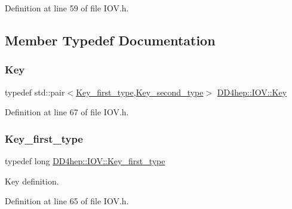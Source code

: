 Definition at line 59 of file I\+O\+V.\+h.



\subsection{Member Typedef Documentation}
\hypertarget{class_d_d4hep_1_1_i_o_v_a07cb46dc875296dc9cccf4ff370104ae}{}\label{class_d_d4hep_1_1_i_o_v_a07cb46dc875296dc9cccf4ff370104ae} 
\subsubsection{\texorpdfstring{Key}{Key}}
{\footnotesize\ttfamily typedef std\+::pair$<$\hyperlink{class_d_d4hep_1_1_i_o_v_a3f518f6b507c82c4ee614e52b3519325}{Key\+\_\+first\+\_\+type},\hyperlink{class_d_d4hep_1_1_i_o_v_ae1e4d1584dcc17a416008a93d94376b5}{Key\+\_\+second\+\_\+type}$>$ \hyperlink{class_d_d4hep_1_1_i_o_v_a07cb46dc875296dc9cccf4ff370104ae}{D\+D4hep\+::\+I\+O\+V\+::\+Key}}



Definition at line 67 of file I\+O\+V.\+h.

\hypertarget{class_d_d4hep_1_1_i_o_v_a3f518f6b507c82c4ee614e52b3519325}{}\label{class_d_d4hep_1_1_i_o_v_a3f518f6b507c82c4ee614e52b3519325} 
\subsubsection{\texorpdfstring{Key\+\_\+first\+\_\+type}{Key\_first\_type}}
{\footnotesize\ttfamily typedef long \hyperlink{class_d_d4hep_1_1_i_o_v_a3f518f6b507c82c4ee614e52b3519325}{D\+D4hep\+::\+I\+O\+V\+::\+Key\+\_\+first\+\_\+type}}



Key definition. 



Definition at line 65 of file I\+O\+V.\+h.

\hypertarget{class_d_d4hep_1_1_i_o_v_ae1e4d1584dcc17a416008a93d94376b5}{}\label{class_d_d4hep_1_1_i_o_v_ae1e4d1584dcc17a416008a93d94376b5} 
